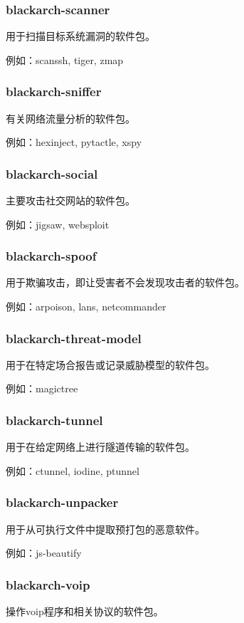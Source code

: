 \documentclass[a4paper, oneside, 11pt]{book}
\begin{document}
\subsubsection{blackarch-scanner}
用于扫描目标系统漏洞的软件包。

例如：scanssh, tiger, zmap

\subsubsection{blackarch-sniffer}
有关网络流量分析的软件包。

例如：hexinject, pytactle, xspy

\subsubsection{blackarch-social}
主要攻击社交网站的软件包。

例如：jigsaw, websploit

\subsubsection{blackarch-spoof}
用于欺骗攻击，即让受害者不会发现攻击者的软件包。

例如：arpoison, lans, netcommander

\subsubsection{blackarch-threat-model}
用于在特定场合报告或记录威胁模型的软件包。

例如：magictree

\subsubsection{blackarch-tunnel}
用于在给定网络上进行隧道传输的软件包。

例如：ctunnel, iodine, ptunnel

\subsubsection{blackarch-unpacker}
用于从可执行文件中提取预打包的恶意软件。

例如：js-beautify

\subsubsection{blackarch-voip}
操作voip程序和相关协议的软件包。
\end{document}
